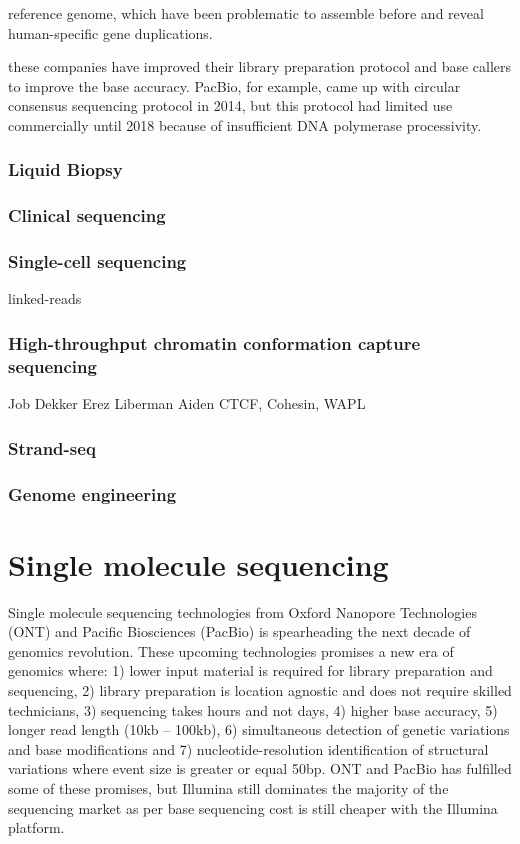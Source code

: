reference genome, which have been problematic to assemble before and reveal human-specific gene duplications.   

these companies have improved their library preparation protocol and base callers to improve the base accuracy. PacBio, for example, came up with circular consensus sequencing protocol in 2014, but this protocol had limited use commercially until 2018 because of insufficient DNA polymerase processivity.   

\subsubsection{Liquid Biopsy}

\subsubsection{Clinical sequencing}

\subsubsection{Single-cell sequencing}

linked-reads

\subsubsection{High-throughput chromatin conformation capture sequencing}

Job Dekker
Erez Liberman Aiden
CTCF, Cohesin, WAPL

\subsubsection{Strand-seq}

\subsubsection{Genome engineering}

\section{Single molecule sequencing}

Single molecule sequencing technologies from Oxford Nanopore Technologies (ONT) and Pacific Biosciences (PacBio) is spearheading the next decade of genomics revolution. These upcoming technologies promises a new era of genomics where: 1) lower input material is required for library preparation and sequencing, 2) library preparation is location agnostic and does not require skilled technicians, 3) sequencing takes hours and not days, 4) higher base accuracy, 5) longer read length (10kb – 100kb), 6) simultaneous detection of genetic variations and base modifications and 7) nucleotide-resolution identification of structural variations where event size is greater or equal 50bp. ONT and PacBio has fulfilled some of these promises, but Illumina still dominates the majority of the sequencing market as per base sequencing cost is still cheaper with the Illumina platform.

